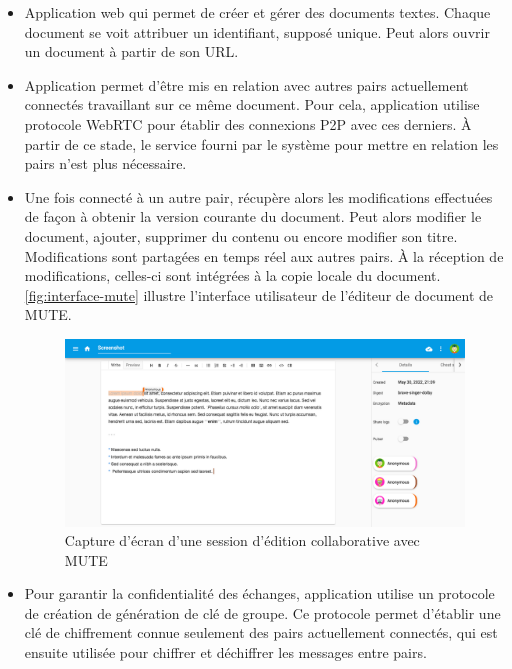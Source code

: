 \begin{itemize}
    \item Application web qui permet de créer et gérer des documents textes.
        Chaque document se voit attribuer un identifiant, supposé unique.
        Peut alors ouvrir un document à partir de son URL.
    \item Application permet d'être mis en relation avec autres pairs actuellement connectés travaillant sur ce même document.
        Pour cela, application utilise protocole WebRTC pour établir des connexions \ac{P2P} avec ces derniers.
        À partir de ce stade, le service fourni par le système pour mettre en relation les pairs n'est plus nécessaire.
    \item Une fois connecté à un autre pair, récupère alors les modifications effectuées de façon à obtenir la version courante du document.
        Peut alors modifier le document, \ie ajouter, supprimer du contenu ou encore modifier son titre.
        Modifications sont partagées en temps réel aux autres pairs.
        À la réception de modifications, celles-ci sont intégrées à la copie locale du document.
        \autoref{fig:interface-mute} illustre l'interface utilisateur de l'éditeur de document de MUTE.
        \begin{figure}[!ht]
            \centering
            \includegraphics[width=\linewidth]{img/screenshot-mute-editor.png}
            \caption{Capture d'écran d'une session d'édition collaborative avec MUTE}
            \label{fig:interface-mute-editor}
        \end{figure}
    \item Pour garantir la confidentialité des échanges, application utilise un protocole de création de génération de clé de groupe.
        Ce protocole permet d'établir une clé de chiffrement connue seulement des pairs actuellement connectés, qui est ensuite utilisée pour chiffrer et déchiffrer les messages entre pairs.

\end{itemize}
